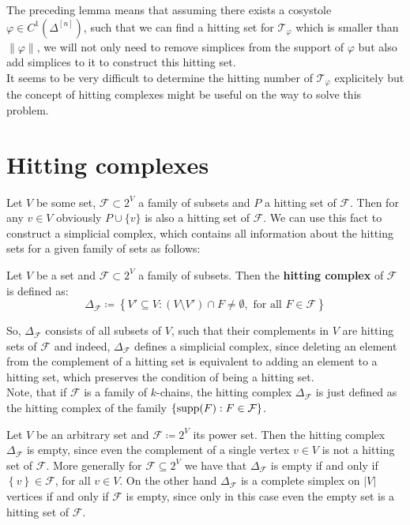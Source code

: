 The preceding lemma means that assuming there exists a cosystole \(\varphi\in C^1(\Delta^{[n]})\), such that we can find a hitting set for \(\mathcal{T}_{\varphi}\) which is smaller than \(\|\varphi\|\), we will not only need to remove simplices from the support of \(\varphi\) but also add simplices to it to construct this hitting set.\\
It seems to be very difficult to determine the hitting number of \(\mathcal{T}_{\varphi}\) explicitely but the concept of hitting complexes might be useful on the way to solve this problem.

\section{Hitting complexes}

Let \(V\) be some set, \(\mathcal{F}\subset 2^V\) a family of subsets and \(P\) a hitting set of \(\mathcal{F}\). Then for any \(v\in V\) obviously \(P\cup\{v\}\) is also a hitting set of \(\mathcal{F}\). We can use this fact to construct a simplicial complex, which contains all information about the hitting sets for a given family of sets as follows:

\begin{defi}
Let \(V\) be a set and \(\mathcal{F}\subset 2^V\) a family of subsets. Then the \textbf{hitting complex} of \(\mathcal{F}\) is defined as:
\[
\Delta_{\mathcal{F}}\coloneqq \left\{V'\subseteq V:(V\setminus V')\cap F\neq\emptyset,\text{ for all }F\in\mathcal{F}\right\}
\]
\end{defi}
So, \(\Delta_{\mathcal{F}}\) consists of all subsets of \(V\), such that their complements in \(V\) are hitting sets of \(\mathcal{F}\) and indeed, \(\Delta_{\mathcal{F}}\) defines a simplicial complex, since deleting an element from the complement of a hitting set is equivalent to adding an element to a hitting set, which preserves the condition of being a hitting set.\\
Note, that if \(\mathcal{F}\) is a family of \(k\)-chains, the hitting complex \(\Delta_{\mathcal{F}}\) is just defined as the hitting complex of the family \(\{\mathrm{supp}(F):F\in\mathcal{F}\}\).

\begin{expl}
Let \(V\) be an arbitrary set and \(\mathcal{F}\coloneqq 2^V\) its power set. Then the hitting complex \(\Delta_{\mathcal{F}}\) is empty, since even the complement of a single vertex \(v\in V\) is not a hitting set of \(\mathcal{F}\). More generally for \(\mathcal{F}\subseteq 2^V\) we have that \(\Delta_{\mathcal{F}}\) is empty if and only if \(\left\{v\right\}\in\mathcal{F}\), for all \(v\in V\). On the other hand \(\Delta_{\mathcal{F}}\) is a complete simplex on \(\left|V\right|\) vertices if and only if \(\mathcal{F}\) is empty, since only in this case even the empty set is a hitting set of \(\mathcal{F}\).
\end{expl}


